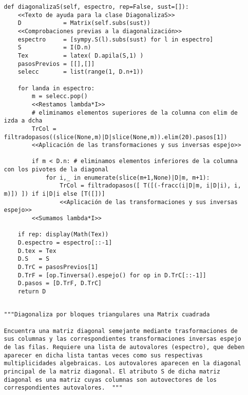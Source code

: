 \documentclass[11pt]{report}
\begin{document}
\begin{verbatim}
def diagonalizaS(self, espectro, rep=False, sust=[]):
    <<Texto de ayuda para la clase DiagonalizaS>>
    D            = Matrix(self.subs(sust))
    <<Comprobaciones previas a la diagonalización>>
    espectro     = [sympy.S(l).subs(sust) for l in espectro]    
    S            = I(D.n)
    Tex          = latex( D.apila(S,1) )
    pasosPrevios = [[],[]]
    selecc       = list(range(1, D.n+1))

    for landa in espectro:
        m = selecc.pop()
        <<Restamos lambda*I>>
        # eliminamos elementos superiores de la columna con elim de izda a dcha
        TrCol = filtradopasos((slice(None,m)|D|slice(None,m)).elim(20).pasos[1])
        <<Aplicación de las transformaciones y sus inversas espejo>>
        
        if m < D.n: # eliminamos elementos inferiores de la columna con los pivotes de la diagonal
            for i,_ in enumerate(slice(m+1,None)|D|m, m+1):
                TrCol = filtradopasos([ T([(-fracc(i|D|m, i|D|i), i, m)]) ]) if i|D|i else [T([])]
                <<Aplicación de las transformaciones y sus inversas espejo>>     
        <<Sumamos lambda*I>>
                    
    if rep: display(Math(Tex))
    D.espectro = espectro[::-1]
    D.tex = Tex
    D.S   = S
    D.TrC = pasosPrevios[1]
    D.TrF = [op.Tinversa().espejo() for op in D.TrC[::-1]]
    D.pasos = [D.TrF, D.TrC]
    return D
    
\end{verbatim}

\begin{verbatim}
"""Diagonaliza por bloques triangulares una Matrix cuadrada

Encuentra una matriz diagonal semejante mediante trasformaciones de
sus columnas y las correspondientes transformaciones inversas espejo
de las filas. Requiere una lista de autovalores (espectro), que deben
aparecer en dicha lista tantas veces como sus respectivas
multiplicidades algebraicas. Los autovalores aparecen en la diagonal
principal de la matriz diagonal. El atributo S de dicha matriz
diagonal es una matriz cuyas columnas son autovectores de los
correspondientes autovalores.  """
\end{verbatim}
\end{document}
